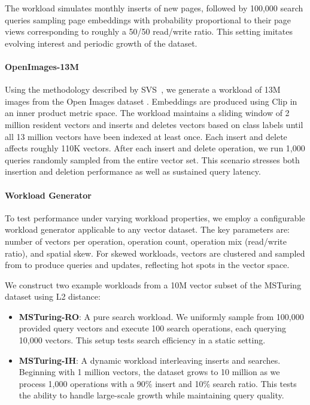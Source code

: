 The workload simulates monthly inserts of new pages, followed by 100,000 search queries sampling page embeddings with probability proportional to their page views corresponding to roughly a 50/50 read/write ratio. This setting imitates evolving interest and periodic growth of the dataset.

\paragraph{OpenImages-13M}
Using the methodology described by SVS~\cite{aguerrebere2024locally}, we generate a workload of 13M images from the Open Images dataset \cite{Kuznetsova_2020}. Embeddings are produced using Clip \cite{radford2021learningtransferablevisualmodels} in an inner product metric space. The workload maintains a sliding window of 2 million resident vectors and inserts and deletes vectors based on class labels until all 13 million vectors have been indexed at least once. Each insert and delete affects roughly 110K vectors. After each insert and delete operation, we run 1,000 queries randomly sampled from the entire vector set. This scenario stresses both insertion and deletion performance as well as sustained query latency.

\paragraph{Workload Generator} 
To test performance under varying workload properties, we employ a configurable workload generator applicable to any vector dataset. The key parameters are: number of vectors per operation, operation count, operation mix (read/write ratio), and spatial skew. For skewed workloads, vectors are clustered and sampled from to produce queries and updates, reflecting hot spots in the vector space.

We construct two example workloads from a 10M vector subset of the MSTuring~\cite{bigann} dataset using L2 distance:

\begin{itemize}[leftmargin=*, itemsep=-1ex, topsep=0pt]
    \item \textbf{MSTuring-RO}: A pure search workload. We uniformly sample from 100,000 provided query vectors and execute 100 search operations, each querying 10,000 vectors. This setup tests search efficiency in a static setting.
    \item \textbf{MSTuring-IH}: A dynamic workload interleaving inserts and searches. Beginning with 1 million vectors, the dataset grows to 10 million as we process 1,000 operations with a 90\% insert and 10\% search ratio. This tests the ability to handle large-scale growth while maintaining query quality.
\end{itemize}

